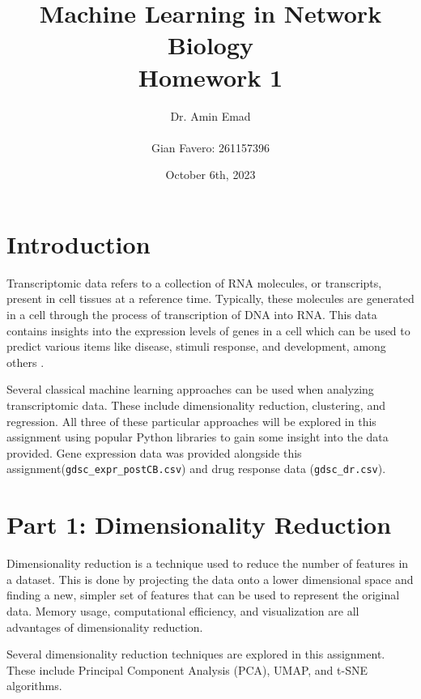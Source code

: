 \documentclass[12pt]{article}
\begin{document}
\title{Machine Learning in Network Biology\\Homework 1}
\author{
    Dr. Amin Emad \\ \\
    Gian Favero: 261157396 \\
}
\date{October 6th, 2023}
\maketitle
\newpage

\tableofcontents
\newpage

\section{Introduction}
Transcriptomic data refers to a collection of RNA molecules, or transcripts, present in cell tissues at a reference time. Typically, these molecules are generated in a cell through the process of transcription of DNA into RNA. This data contains insights into the expression levels of genes in a cell which can be used to predict various items like disease, stimuli response, and development, among others \cite{noauthor_transcriptome_nodate}.

Several classical machine learning approaches can be used when analyzing transcriptomic data. These include dimensionality reduction, clustering, and regression. All three of these particular approaches will be explored in this assignment using popular Python libraries to gain some insight into the data provided. Gene expression data was provided alongside this assignment(\verb|gdsc_expr_postCB.csv|) and drug response data (\verb|gdsc_dr.csv|).

\section{Part 1: Dimensionality Reduction}
Dimensionality reduction is a technique used to reduce the number of features in a dataset. This is done by projecting the data onto a lower dimensional space and finding a new, simpler set of features that can be used to represent the original data. Memory usage, computational efficiency, and visualization are all advantages of dimensionality reduction.

Several dimensionality reduction techniques are explored in this assignment. These include Principal Component Analysis (PCA), UMAP, and t-SNE algorithms.
\end{document}
